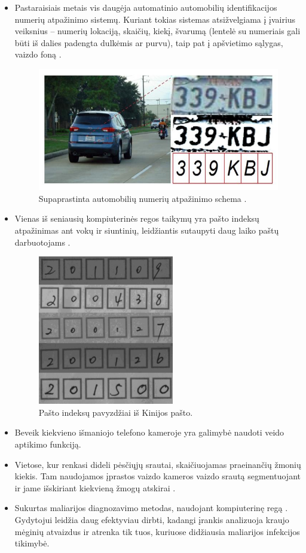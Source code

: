 \documentclass[a4paper,12pt]{article}
\begin{document}
\begin{itemize}
\item Pastaraisiais metais vis daugėja automatinio automobilių identifikacijos numerių atpažinimo sistemų. Kuriant tokias sistemas atsižvelgiama į įvairius veiksnius – numerių lokaciją, skaičių, kiekį, švarumą (lentelė su numeriais gali būti iš dalies padengta dulkėmis ar purvu), taip pat į apšvietimo sąlygas, vaizdo foną \cite{CARPLATE}.
\begin{figure}[H]
	\centering
	\includegraphics[scale=0.5]{images/carplate}
	\caption{Supaprastinta automobilių numerių atpažinimo schema \cite{PLATEIMG}.}   %
	\label{img:carplate}
\end{figure}
\item Vienas iš seniausių kompiuterinės regos taikymų yra pašto indeksų atpažinimas ant vokų ir siuntinių, leidžiantis sutaupyti daug laiko paštų darbuotojams \cite{POSTCODE}.
\begin{figure}[H]
	\centering
	\includegraphics[scale=0.4]{images/postcode}
	\caption{Pašto indeksų pavyzdžiai iš Kinijos pašto.}   %
	\label{img:postcode}
\end{figure}
\item Beveik kiekvieno išmaniojo telefono kameroje yra galimybė naudoti veido aptikimo funkciją.
\item Vietose, kur renkasi dideli pėsčiųjų srautai, skaičiuojamas praeinančių žmonių kiekis. Tam naudojamos įprastos vaizdo kameros vaizdo srautą segmentuojant ir jame išskiriant kiekvieną žmogų atskirai \cite{PEOPLECOUNT}.
\item Sukurtas maliarijos diagnozavimo metodas, naudojant kompiuterinę regą \cite{MALARIA}. Gydytojui leidžia daug efektyviau dirbti, kadangi įrankis analizuoja kraujo mėginių atvaizdus ir atrenka tik tuos, kuriuose didžiausia maliarijos infekcijos tikimybė.
\end{itemize}
\end{document}
